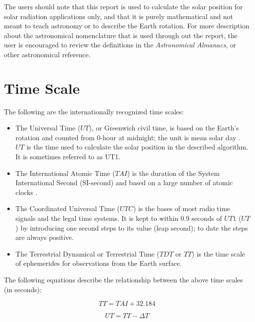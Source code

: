 \documentclass{article}
\begin{document}
\par The users should note that this report is used to calculate the
solar position for solar radiation applications only, and that it is
purely mathematical and not meant to teach astronomy or to describe
the Earth rotation. For more description about the astronomical
nomenclature that is used through out the report, the user is
encouraged to review the definitions in the \textit{Astronomical
  Almanacs}, or other astronomical reference.

\section{Time Scale}

\par The following are the internationally recognized time scales:

\begin{itemize}
\item The Universal Time ($UT$), or Greenwich civil time, is based on
  the Earth’s rotation and counted from 0-hour at midnight; the unit
  is mean solar day \cite{meeus}. $UT$ is the time used to calculate
  the solar position in the described algorithm. It is sometimes
  referred to as UT1.
\item The International Atomic Time ($TAI$) is the duration of the
  System International Second (SI-second) and based on a large number
  of atomic clocks \cite{norwich}.
\item The Coordinated Universal Time ($UTC$) is the bases of most
  radio time signals and the legal time systems. It is kept to within
  0.9 seconds of $UT1$ ($UT$) by introducing one second steps to its
  value (leap second); to date the steps are always positive.
\item The Terrestrial Dynamical or Terrestrial Time ($TDT$ or $TT$) is
  the time scale of ephemerides for observations from the Earth
  surface.
\end{itemize}

\par The following equations describe the relationship between the above
time scales (in seconds):

\begin{equation}
  \label{eq:tt}
  TT = TAI + 32.184
\end{equation}

\begin{equation}
  \label{eq:ut}
  UT = TT - \Delta T
\end{equation}
\end{document}
